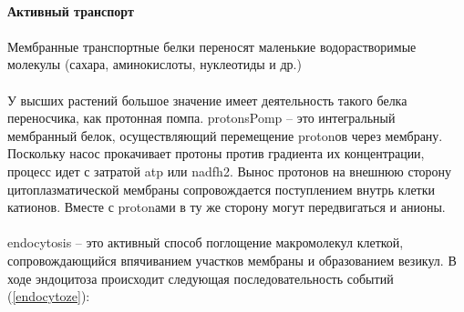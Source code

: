 \paragraph*{Активный транспорт}

\paragraph*{}Мембранные транспортные белки переносят маленькие водорастворимые молекулы (сахара, аминокислоты, нуклеотиды и др.)

\paragraph*{}

\paragraph*{}У высших растений большое значение имеет деятельность такого белка переносчика, как протонная помпа. \gls{protonsPomp} -- это интегральный мембранный белок, осуществляющий перемещение \gls{proton}ов через мембрану.  Поскольку насос прокачивает протоны против градиента их концентрации, процесс идет с затратой \gls{atp} или \gls{nadfh2}. Вынос протонов на внешнюю сторону цитоплазматической мембраны сопровождается поступлением внутрь клетки катионов. Вместе с \gls{proton}ами в ту же сторону могут передвигаться и анионы.

\paragraph*{}\Gls{endocytosis} -- это активный способ поглощение макромолекул клеткой, сопровождающийся впячиванием участков мембраны и образованием везикул.  В ходе эндоцитоза происходит следующая последовательность событий (\ris \ref{endocytoze}):

